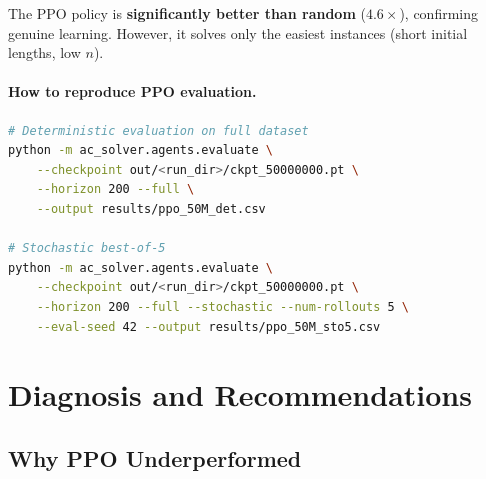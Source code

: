 \documentclass[11pt,a4paper]{article}
\begin{document}
The PPO policy is \textbf{significantly better than random} ($4.6\times$),
confirming genuine learning.  However, it solves only the easiest instances
(short initial lengths, low $n$).

\paragraph{How to reproduce PPO evaluation.}
\begin{lstlisting}[language=bash]
# Deterministic evaluation on full dataset
python -m ac_solver.agents.evaluate \
    --checkpoint out/<run_dir>/ckpt_50000000.pt \
    --horizon 200 --full \
    --output results/ppo_50M_det.csv

# Stochastic best-of-5
python -m ac_solver.agents.evaluate \
    --checkpoint out/<run_dir>/ckpt_50000000.pt \
    --horizon 200 --full --stochastic --num-rollouts 5 \
    --eval-seed 42 --output results/ppo_50M_sto5.csv
\end{lstlisting}

\section{Diagnosis and Recommendations}\label{sec:diagnosis}

\subsection{Why PPO Underperformed}
\end{document}
